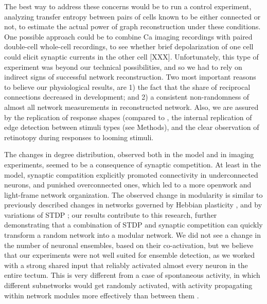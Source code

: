 \documentclass{article}
\begin{document}
The best way to address these concerns would be to run a control experiment, analyzing transfer entropy between pairs of cells known to be either connected or not, to estimate the actual power of graph reconstruction under these conditions. One possible approach could be to combine Ca imaging recordings with paired double-cell whole-cell recordings, to see whether brief depolarization of one cell could elicit synaptic currents in the other cell [XXX]. Unfortunately, this type of experiment was beyond our technical possibilities, and so we had to rely on indirect signs of successful network reconstruction. Two most important reasons to believe our physiological results, are 1) the fact that the share of reciprocal connections decreased in development; and 2) a consistent non-randomness of almost all network measurements in reconstructed network. Also, we are assured by the replication of response shapes (compared to \citep{khakhalin2014}, the internal replication of edge detection between stimuli types (see Methods), and the clear observation of retinotopy during responses to looming stimuli.

The changes in degree distribution, observed both in the model and in imaging experiments, seemed to be a consequence of synaptic competition. At least in the model, synaptic compatition explicitly promoted connectivity in underconnected neurons, and punished overconnected ones, which led to a more openwork and light-frame network organization. The observed change in modularity is similar to previously described changes in networks governed by Hebbian plasticity \citep{triplett2018emergence,damicelli2018topomod}, and by variations of STDP \citep{stam2010modular}; our results contribute to this research, further demonstrating that a combination of STDP and synaptic competition can quickly transform a random network into a modular network. We did not see a change in the number of neuronal ensembles, based on their co-activation, but we believe that our experiments were not well suited for ensemble detection, as we worked with a strong shared input that reliably activated almost every neuron in the entire tectum. This is very different from a case of spontaneous activity, in which different subnetworks would get randomly activated, with activity propagating within network modules more effectively than between them \citep{avitan2017spontaneous}.
\end{document}
